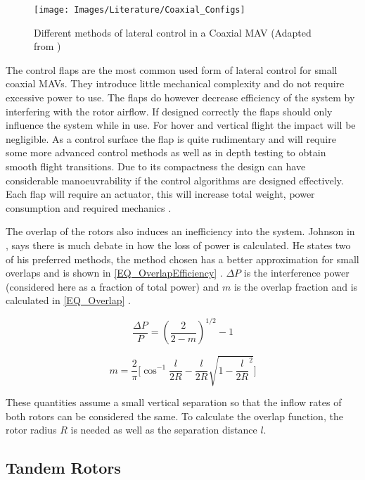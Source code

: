 \begin{figure}[H]
	\centering
	\texttt{[image: Images/Literature/Coaxial\_Configs]}     
	\caption{Different methods of lateral control in a Coaxial MAV (Adapted from \cite{Bohorquez})}
	\label{IM_Coaxial_Variations}
\end{figure}

The control flaps are the most common used form of lateral control for small coaxial MAVs. They introduce little mechanical complexity and do not require excessive power to use. The flaps do however decrease efficiency of the system by interfering with the rotor airflow. If designed correctly the flaps should only influence the system while in use. For hover and vertical flight the impact will be negligible. As a control surface the flap is quite rudimentary and will require some more advanced control methods as well as in depth testing to obtain smooth flight transitions. Due to its compactness the design can have considerable manoeuvrability if the control algorithms are designed effectively. Each flap will require an actuator, this will increase total weight, power consumption and required mechanics \cite{Bohorquez}. 

The overlap of the rotors also induces an inefficiency into the system. Johnson in \cite{HeliTheory}, says there is much debate in how the loss of power is calculated. He states two of his preferred methods, the method chosen has a better approximation for small overlaps and is shown in \eqref{EQ_OverlapEfficiency} \cite{HeliTheory}. $\Delta P$ is the interference power (considered here as a fraction of total power) and $m$ is the overlap fraction and is calculated in \eqref{EQ_Overlap} \cite{HeliTheory}.

\begin{equation}
\label{EQ_OverlapEfficiency}
\frac{\Delta P}{P} = (\frac{2}{2-m})^{1/2} - 1
\end{equation}

\begin{equation}
\label{EQ_Overlap}
m = \frac{2}{\pi} \Bigg[ \cos^{-1}\frac{l}{2R} - \dfrac{l}{2R}\sqrt{1 - {\dfrac{l}{2R}}^2} \Bigg]
\end{equation}

These quantities assume a small vertical separation so that the inflow rates of both rotors can be considered the same. To calculate the overlap function, the rotor radius $R$ is needed as well as the separation distance $l$. 

\subsection{Tandem Rotors}

